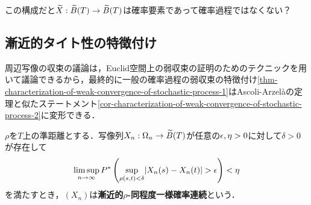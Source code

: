 \documentclass[uplatex,dvipdfmx]{jsreport}
\begin{document}
\begin{remarks}
    この構成だと$\widetilde{X}:\widetilde{B}(T)\to\widetilde{B}(T)$は確率要素であって確率過程ではなくない？
\end{remarks}

\subsection{漸近的タイト性の特徴付け}

\begin{tcolorbox}[colframe=ForestGreen, colback=ForestGreen!10!white,breakable,colbacktitle=ForestGreen!40!white,coltitle=black,fonttitle=\bfseries\sffamily,
title=タイトな可測関数に収束するための十分条件を探るために]
    周辺写像の収束の議論は，Euclid空間上の弱収束の証明のためのテクニックを用いて議論できるから，最終的に一般の確率過程の弱収束の特徴付け\ref{thm-characterization-of-weak-convergence-of-stochastic-process-1}はAscoli-Arzelàの定理と似たステートメント\ref{cor-characterization-of-weak-convergence-of-stochastic-process-2}に変形できる．
\end{tcolorbox}

\begin{definition}
    $\rho$を$T$上の準距離とする．写像列$X_n:\Omega_n\to\widetilde{B}(T)$が任意の$\epsilon,\eta>0$に対して$\delta>0$が存在して
    \[\limsup_{n\to\infty} P^*\left(\sup_{\rho(s,t)<\delta}\lvert X_n(s)-X_n(t)\rvert>\epsilon\right)<\eta\]
    を満たすとき，$(X_n)$は\textbf{漸近的$\rho$-同程度一様確率連続}という．
\end{definition}
\end{document}
